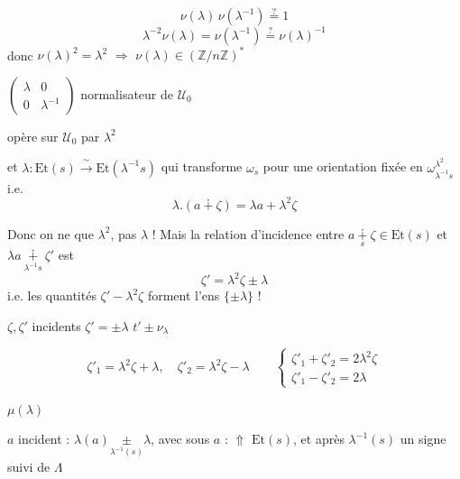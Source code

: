 \documentclass[11pt,a4paper]{article}
\begin{document}
\[
  \nu(\lambda)\,\nu(\lambda^{-1}) \overset{?}{=} 1
\]
\[
  \lambda^{-2}\nu(\lambda) = \nu(\lambda^{-1}) \overset{?}{=} \nu(\lambda)^{-1}
\]
donc $\nu(\lambda)^{2} = \lambda^{2}$ $\Longrightarrow$ $\boxed{\nu(\lambda)\in(\mathbb{Z}/n\mathbb{Z})^{*}}$

$\begin{pmatrix}\lambda & 0\\ 0 & \lambda^{-1}\end{pmatrix}$ normalisateur de $\mathcal{U}_0$

opère sur $\mathcal{U}_0$ par $\boxed{\lambda^{2}}$

et $\lambda : \mathrm{Et}(s)\xrightarrow{\ \sim\ }\mathrm{Et}(\lambda^{-1}s)$ qui transforme $\omega_s$ pour une orientation fixée en $\omega_{\lambda^{-1}s}^{\boxed{\lambda^{2}}}$ i.e.
\[
  \boxed{\lambda.(a\dotplus\zeta) = \lambda a + \lambda^{2}\zeta}
\]

Donc on ne  que $\lambda^{2}$, pas $\lambda$ ! Mais la relation d'incidence entre $a\underset{s}{\dotplus}\zeta\in\mathrm{Et}(s)$ et $\lambda a\underset{\lambda^{-1}s}{\dotplus}\zeta'$ est
\[
  \zeta' = \lambda^{2}\zeta \pm \lambda
\]
i.e. les quantités $\zeta' - \lambda^{2}\zeta$ forment l'ens $\{\pm\lambda\}$ !


$\zeta,\zeta'$ incidents \qquad $\zeta' = \pm\lambda$ \qquad \struck{\ill{}} \qquad $t'\pm\nu_\lambda$

\[
  \zeta'_1 = \lambda^{2}\zeta + \lambda, \quad \zeta'_2 = \lambda^{2}\zeta - \lambda
  \qquad
  \begin{cases}
    \zeta'_1 + \zeta'_2 = 2\lambda^{2}\zeta \\
    \zeta'_1 - \zeta'_2 = 2\lambda
  \end{cases}
\]

$\mu(\lambda)$

 $a$ incident : $\lambda(a)\underset{\lambda^{-1}(s)}{\pm}\lambda$, avec sous $a$ : $\Uparrow$ $\mathrm{Et}(s)$, et après $\lambda^{-1}(s)$ un signe \ill{} suivi de $\Lambda$
\end{document}
